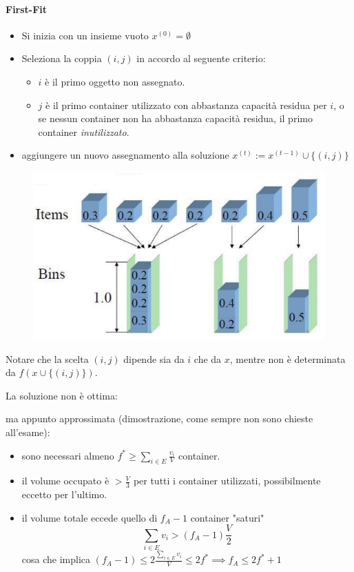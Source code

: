 \documentclass{article}
\begin{document}
    \paragraph{First-Fit}
    \begin{itemize}
        \item Si inizia con un insieme vuoto $x^{(0)}=\emptyset$
        \item Seleziona la coppia $(i,j)$ in accordo al seguente criterio:
              \begin{itemize}
                  \item $i$ è il primo oggetto non assegnato.
                  \item $j$ è il primo container utilizzato con abbastanza capacità
                        residua per $i$, o se nessun container non ha abbastanza capacità residua,
                        il primo container \textit{inutilizzato}.
              \end{itemize}
        \item aggiungere un nuovo assegnamento alla soluzione $x^{(t)}:=x^{(t-1)}\cup\{(i,j)\}$
    \end{itemize}
    \begin{figure}[H]
        \centering
        \includegraphics[scale=0.5]{images/bpp_first-fit.png}
    \end{figure}
    Notare che la scelta $(i,j)$ dipende sia da $i$ che da $x$, mentre non è
    determinata da $f(x\cup\{(i,j)\})$.

    La soluzione non è ottima:

    ma appunto approssimata (dimostrazione, come sempre non sono
    chieste all'esame):
    \begin{itemize}
        \item sono necessari almeno $f^*\geq\sum_{i\in E}\frac{v_i}{V}$ container.
        \item il volume occupato è $>\frac{V}{3}$ per tutti i container utilizzati,
              possibilmente eccetto per l'ultimo.
        \item il volume totale eccede quello di $f_A-1$ container "saturi"
              $$\sum_{i\in E}v_i > (f_A-1)\frac{V}{2}$$
              cosa che implica $(f_A-1)\leq 2\frac{\sum_{i\in E}v_i}{V}\leq 2f^*\implies f_A\leq 2f^* +1$
    \end{itemize}
\end{document}
